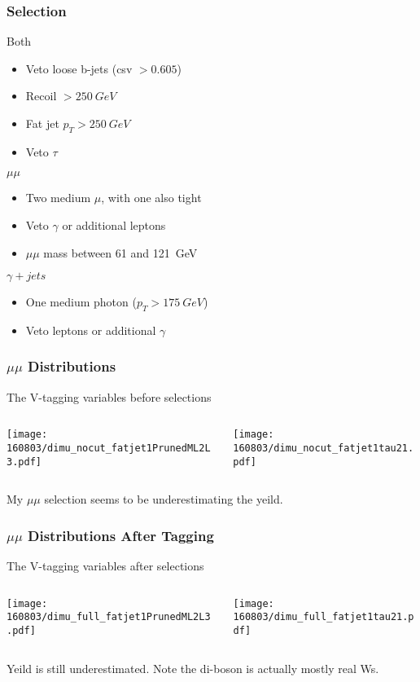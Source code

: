 \documentclass{beamer}
\begin{document}
\begin{frame}
  \frametitle{Selection}
  Both
  \begin{itemize}
  \item Veto loose b-jets (csv $> 0.605$)
  \item Recoil $> \SI{250}{GeV}$
  \item Fat jet $p_T > \SI{250}{GeV}$
  \item Veto $\tau$
  \end{itemize}
  $\mu\mu$
  \begin{itemize}
  \item Two medium $\mu$, with one also tight
  \item Veto $\gamma$ or additional leptons
  \item $\mu\mu$ mass between 61 and \SI{121}{GeV}
  \end{itemize}
  $\gamma + jets$
  \begin{itemize}
  \item One medium photon ($p_T > \SI{175}{GeV}$)
  \item Veto leptons or additional $\gamma$
  \end{itemize}
\end{frame}

\begin{frame}
  \frametitle{$\mu\mu$ Distributions}
  The V-tagging variables before selections
  \begin{columns}
    \begin{column}{0.5\linewidth}
      \centering
      \texttt{[image: 160803/dimu\_nocut\_fatjet1PrunedML2L3.pdf]}
    \end{column}
    \begin{column}{0.5\linewidth}
      \centering
      \texttt{[image: 160803/dimu\_nocut\_fatjet1tau21.pdf]}
    \end{column}
  \end{columns}
  My $\mu\mu$ selection seems to be underestimating the yeild.
\end{frame}

\begin{frame}
  \frametitle{$\mu\mu$ Distributions After Tagging}
  The V-tagging variables after selections
  \begin{columns}
    \begin{column}{0.5\linewidth}
      \centering
      \texttt{[image: 160803/dimu\_full\_fatjet1PrunedML2L3.pdf]}
    \end{column}
    \begin{column}{0.5\linewidth}
      \centering
      \texttt{[image: 160803/dimu\_full\_fatjet1tau21.pdf]}
    \end{column}
  \end{columns}
  Yeild is still underestimated.
  Note the di-boson is actually mostly real Ws.
\end{frame}
\end{document}
